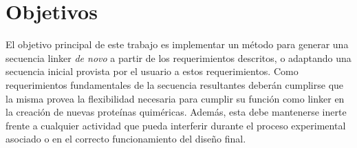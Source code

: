% 




   
       
       
       

       
       
       
       
       
       
\section{Objetivos}

El objetivo principal de este trabajo es implementar un método para generar una secuencia linker \textit{de novo} a partir de los requerimientos descritos, o adaptando una secuencia inicial provista por el usuario a estos requerimientos. 
Como requerimientos fundamentales de la secuencia resultantes deberán cumplirse que la misma provea la flexibilidad necesaria para cumplir su función como linker en la creación de nuevas proteínas quiméricas.
Además, esta debe mantenerse inerte frente a cualquier actividad que pueda interferir durante el proceso experimental asociado o en el correcto funcionamiento del diseño final.


